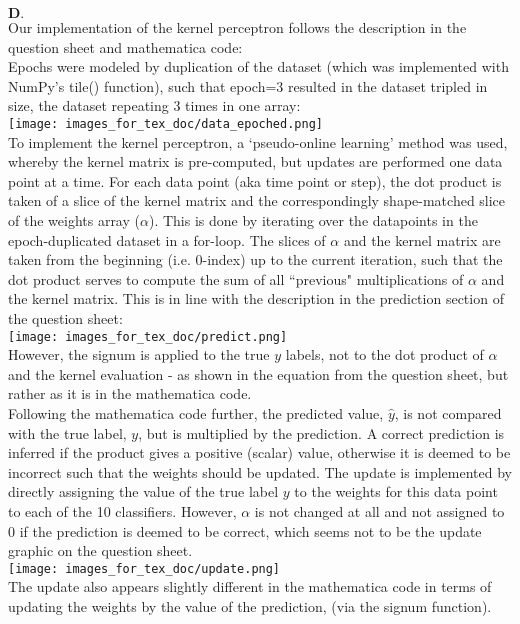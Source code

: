\documentclass[a4paper,12pt]{article}
\begin{document}
$\textbf{D.}$\\ 
Our implementation of the kernel perceptron follows the description in the question sheet and mathematica code:\\ 
Epochs were modeled by duplication of the dataset (which was implemented with NumPy's tile() function), such that epoch=3 resulted in the dataset tripled in size, the dataset repeating 3 times in one array:\\ 
\texttt{[image: images\_for\_tex\_doc/data\_epoched.png]}\\
To implement the kernel perceptron, a `pseudo-online learning' method was used, whereby the kernel matrix is pre-computed, but updates are performed one data point at a time. For each data point (aka time point or step), the dot product is taken of a slice of the kernel matrix and the correspondingly shape-matched slice of the weights array ($\alpha$). This is done by iterating over the datapoints in the epoch-duplicated dataset in a for-loop. The slices of $\alpha$ and the kernel matrix are taken from the beginning (i.e. 0-index) up to the current iteration, such that the dot product serves to compute the sum of all ``previous" multiplications of $\alpha$ and the kernel matrix. This is in line with the description in the prediction section of the question sheet: \\
\texttt{[image: images\_for\_tex\_doc/predict.png]}\\
However, the signum is applied to the true $y$ labels, not to the dot product of $\alpha$ and the kernel evaluation - as shown in the equation from the question sheet, but rather as it is in the mathematica code. \\ Following the mathematica code further, the predicted value, $\hat{y}$, is not compared with the true label, $y$, but is multiplied by the prediction. A correct prediction is inferred if the product gives a positive (scalar) value, otherwise it is deemed to be incorrect such that the weights should be updated. The update is implemented by directly assigning the value of the true label $y$ to the weights for this data point to each of the 10 classifiers. However, $\alpha$ is not changed at all and not assigned to 0 if the prediction is deemed to be correct, which seems not to be the update graphic on the question sheet.\\
\texttt{[image: images\_for\_tex\_doc/update.png]}\\
The update also appears slightly different in the mathematica code in terms of updating the weights by the value of the prediction, (via the signum function). \\
\end{document}
